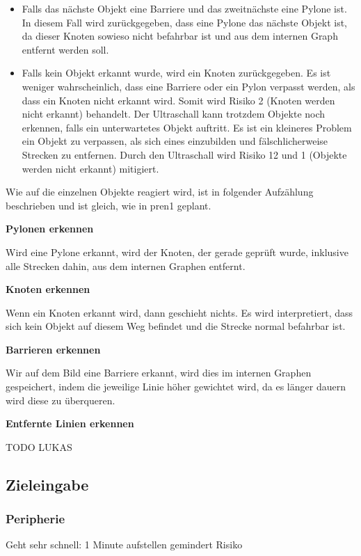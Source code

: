 \begin{itemize}
    \item Falls das nächste Objekt eine Barriere und das zweitnächste eine Pylone ist. In diesem Fall wird zurückgegeben, dass eine Pylone das nächste Objekt ist, da dieser Knoten sowieso nicht befahrbar ist und aus dem internen Graph entfernt werden soll.
    \item Falls kein Objekt erkannt wurde, wird ein Knoten zurückgegeben. Es ist weniger wahrscheinlich, dass eine Barriere oder ein Pylon verpasst werden, als dass ein Knoten nicht erkannt wird. Somit wird Risiko 2 (Knoten werden nicht erkannt) behandelt. Der Ultraschall kann trotzdem Objekte noch erkennen, falls ein unterwartetes Objekt auftritt. Es ist ein kleineres Problem ein Objekt zu verpassen, als sich eines einzubilden und fälschlicherweise Strecken zu entfernen. Durch den Ultraschall wird Risiko 12 und 1 (Objekte werden nicht erkannt) mitigiert.
\end{itemize}


Wie auf die einzelnen Objekte reagiert wird, ist in folgender Aufzählung beschrieben und ist gleich, wie in \acrshort{pren1} geplant.

\textbf{Pylonen erkennen}

Wird eine Pylone erkannt, wird der Knoten, der gerade geprüft wurde, inklusive alle Strecken dahin, aus dem internen Graphen entfernt.

\textbf{Knoten erkennen}

Wenn ein Knoten erkannt wird, dann geschieht nichts. Es wird interpretiert, dass sich kein Objekt auf diesem Weg befindet und die Strecke normal befahrbar ist.

\textbf{Barrieren erkennen}

Wir auf dem Bild eine Barriere erkannt, wird dies im internen Graphen gespeichert, indem die jeweilige Linie höher gewichtet wird, da es länger dauern wird diese zu überqueren.

\textbf{Entfernte Linien erkennen}

TODO LUKAS

\newpage
\subsection{Zieleingabe}

\subsubsection{Peripherie}
\label{zieleingabe}

Geht sehr schnell: 1 Minute aufstellen gemindert Risiko